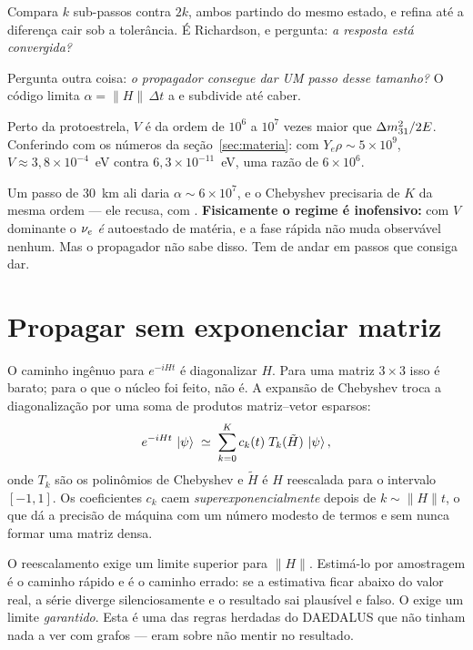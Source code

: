 \begin{description}[leftmargin=0pt, itemsep=0.6ex]
\item[Critério de erro.] Compara $k$ sub-passos contra $2k$, ambos partindo do
  mesmo estado, e refina até a diferença cair sob a tolerância. É Richardson,
  e pergunta: \emph{a resposta está convergida?}
\item[Portão de viabilidade.] Pergunta outra coisa: \emph{o propagador
  consegue dar UM passo desse tamanho?} O código limita
  $\alpha = \|H\|\,\Delta t$ a  e subdivide até caber.
\end{description}

\begin{nota}
Perto da protoestrela, $V$ é da ordem de $10^{6}$ a $10^{7}$ vezes maior que
$\Delta m^2_{31}/2E$. Conferindo com os números da seção~\ref{sec:materia}: com
$Y_e\rho \sim 5\times10^{9}$, $V \approx 3{,}8\times10^{-4}$~eV contra
$6{,}3\times10^{-11}$~eV, uma razão de $6\times10^{6}$.

\medskip
Um passo de 30~km ali daria $\alpha \sim 6\times10^{7}$, e o Chebyshev
precisaria de $K$ da mesma ordem --- ele recusa, com .
\textbf{Fisicamente o regime é inofensivo:} com $V$ dominante o $\nu_e$ \emph{é}
autoestado de matéria, e a fase rápida não muda observável nenhum. Mas o
propagador não sabe disso. Tem de andar em passos que consiga dar.
\end{nota}

\section{Propagar sem exponenciar matriz}

O caminho ingênuo para $e^{-iHt}$ é diagonalizar $H$. Para uma matriz $3\times3$
isso é barato; para o que o núcleo foi feito, não é. A expansão de Chebyshev
troca a diagonalização por uma soma de produtos matriz--vetor esparsos:
\begin{equation}
  e^{-iHt}\,\left|\psi\right\rangle \;\simeq\;
    \sum_{k=0}^{K} c_k(t)\; T_k(\tilde H)\,\left|\psi\right\rangle,
\end{equation}
onde $T_k$ são os polinômios de Chebyshev e $\tilde H$ é $H$ reescalada para o
intervalo $[-1,1]$. Os coeficientes $c_k$ caem \emph{superexponencialmente}
depois de $k \sim \|H\|t$, o que dá a precisão de máquina com um número modesto
de termos e sem nunca formar uma matriz densa.

\begin{alerta}
O reescalamento exige um limite superior para $\|H\|$. Estimá-lo por amostragem
é o caminho rápido e é o caminho errado: se a estimativa ficar abaixo do valor
real, a série diverge silenciosamente e o resultado sai plausível e falso. O
 exige um limite \emph{garantido}. Esta é uma das regras
herdadas do DAEDALUS que não tinham nada a ver com grafos --- eram sobre não
mentir no resultado.
\end{alerta}

